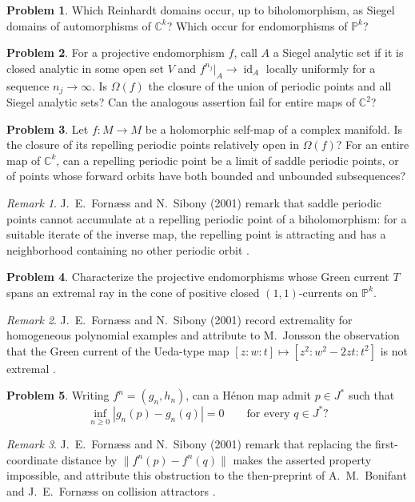 \documentclass[11pt,reqno]{amsart}
\theoremstyle{definition}
\newtheorem{problem}{Problem}[section]
\theoremstyle{remark}
\newtheorem*{remark}{Remark}
\begin{document}
\begin{problem}\label{FS-2.10}
Which Reinhardt domains occur, up to biholomorphism, as Siegel domains of automorphisms of $\mathbb C^k$? Which occur for endomorphisms of $\mathbb P^k$?
\end{problem}


\begin{problem}\label{FS-2.15}
For a projective endomorphism $f$, call $A$ a Siegel analytic set if it is closed analytic in some open set $V$ and $f^{n_j}|_A\to\operatorname{id}_A$ locally uniformly for a sequence $n_j\to\infty$. Is $\Omega(f)$ the closure of the union of periodic points and all Siegel analytic sets? Can the analogous assertion fail for entire maps of $\mathbb C^2$?
\end{problem}


\begin{problem}\label{FS-2.16}
Let $f:M\to M$ be a holomorphic self-map of a complex manifold. Is the closure of its repelling periodic points relatively open in $\Omega(f)$? For an entire map of $\mathbb C^k$, can a repelling periodic point be a limit of saddle periodic points, or of points whose forward orbits have both bounded and unbounded subsequences?
\end{problem}
\begin{remark}
J.~E.~Forn\ae ss and N.~Sibony (2001) remark that saddle periodic points cannot accumulate at a repelling periodic point of a biholomorphism: for a suitable iterate of the inverse map, the repelling point is attracting and has a neighborhood containing no other periodic orbit \cite[Question~2.16]{FS2001}.
\end{remark}

\begin{problem}\label{FS-2.19}
Characterize the projective endomorphisms whose Green current $T$ spans an extremal ray in the cone of positive closed $(1,1)$-currents on $\mathbb P^k$.
\end{problem}
\begin{remark}
J.~E.~Forn\ae ss and N.~Sibony (2001) record extremality for homogeneous polynomial examples and attribute to M.~Jonsson the observation that the Green current of the Ueda-type map $[z:w:t]\mapsto[z^2:w^2-2zt:t^2]$ is not extremal \cite[Question~2.19]{FS2001}.
\end{remark}

\begin{problem}\label{FS-2.23}
Writing $f^n=(g_n,h_n)$, can a H\'enon map admit $p\in J^*$ such that
\[
 \inf_{n\geq0}|g_n(p)-g_n(q)|=0\qquad\text{for every }q\in J^*?
\]
\end{problem}
\begin{remark}
J.~E.~Forn\ae ss and N.~Sibony (2001) remark that replacing the first-coordinate distance by $\|f^n(p)-f^n(q)\|$ makes the asserted property impossible, and attribute this obstruction to the then-preprint of A.~M.~Bonifant and J.~E.~Forn\ae ss on collision attractors \cite[Question~2.23]{FS2001}.
\end{remark}
\end{document}
